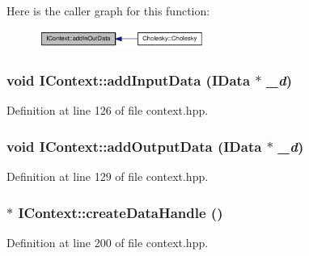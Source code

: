 Here is the caller graph for this function:\nopagebreak
\begin{figure}[H]
\begin{center}
\leavevmode
\includegraphics[width=154pt]{class_i_context_a6e2967c610f62b1e3d1411982efeead6_icgraph}
\end{center}
\end{figure}
\hypertarget{class_i_context_abd000624cf8693096672e84231136980}{
\subsubsection[{addInputData}]{\setlength{\rightskip}{0pt plus 5cm}void IContext::addInputData ({\bf IData} $\ast$ {\em \_\-d})}}
\label{class_i_context_abd000624cf8693096672e84231136980}


Definition at line 126 of file context.hpp.\hypertarget{class_i_context_ad6edf24b50c7ef64bb01dbdd12c88e57}{
\subsubsection[{addOutputData}]{\setlength{\rightskip}{0pt plus 5cm}void IContext::addOutputData ({\bf IData} $\ast$ {\em \_\-d})}}
\label{class_i_context_ad6edf24b50c7ef64bb01dbdd12c88e57}


Definition at line 129 of file context.hpp.\hypertarget{class_i_context_a2ef87189437c74906f961a523602b6c3}{
\subsubsection[{createDataHandle}]{$\ast$ IContext::createDataHandle ()}}
\label{class_i_context_a2ef87189437c74906f961a523602b6c3}


Definition at line 200 of file context.hpp.

